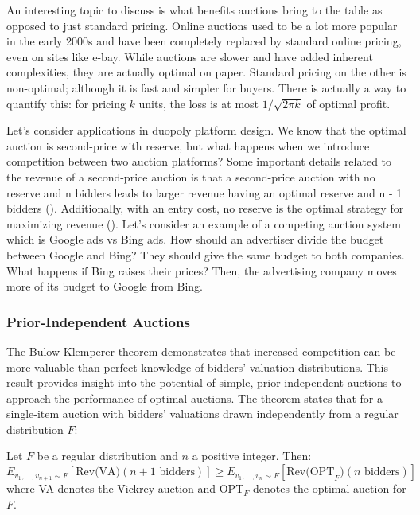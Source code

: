 \documentclass[
  letterpaper,
  DIV=11,
  numbers=noendperiod,
  oneside]{scrreprt}
\theoremstyle{remark}
\begin{document}
An interesting topic to discuss is what benefits auctions bring to the
table as opposed to just standard pricing. Online auctions used to be a
lot more popular in the early 2000s and have been completely replaced by
standard online pricing, even on sites like e-bay. While auctions are
slower and have added inherent complexities, they are actually optimal
on paper. Standard pricing on the other is non-optimal; although it is
fast and simpler for buyers. There is actually a way to quantify this:
for pricing \(k\) units, the loss is at most \(1 / \sqrt{2\pi k}\) of
optimal profit.

Let's consider applications in duopoly platform design. We know that the
optimal auction is second-price with reserve, but what happens when we
introduce competition between two auction platforms? Some important
details related to the revenue of a second-price auction is that a
second-price auction with no reserve and n bidders leads to larger
revenue having an optimal reserve and n - 1 bidders
().
Additionally, with an entry cost, no reserve is the optimal strategy for
maximizing revenue ().
Let's consider an example of a competing auction system which is Google
ads vs Bing ads. How should an advertiser divide the budget between
Google and Bing? They should give the same budget to both companies.
What happens if Bing raises their prices? Then, the advertising company
moves more of its budget to Google from Bing.

\subsubsection*{Prior-Independent
Auctions}\label{prior-independent-auctions}

The Bulow-Klemperer theorem demonstrates that increased competition can
be more valuable than perfect knowledge of bidders' valuation
distributions. This result provides insight into the potential of
simple, prior-independent auctions to approach the performance of
optimal auctions. The theorem states that for a single-item auction with
bidders' valuations drawn independently from a regular distribution
\(F\):

Let \(F\) be a regular distribution and \(n\) a positive integer. Then:
\[E_{v_1,\ldots,v_{n+1} \sim F}[\text{Rev(VA)}(n+1 \text{ bidders})] \geq E_{v_1,\ldots,v_n \sim F}[\text{Rev(OPT}_F)(n \text{ bidders})]\]
where VA denotes the Vickrey auction and \(\text{OPT}_F\) denotes the
optimal auction for \(F\).
\end{document}
